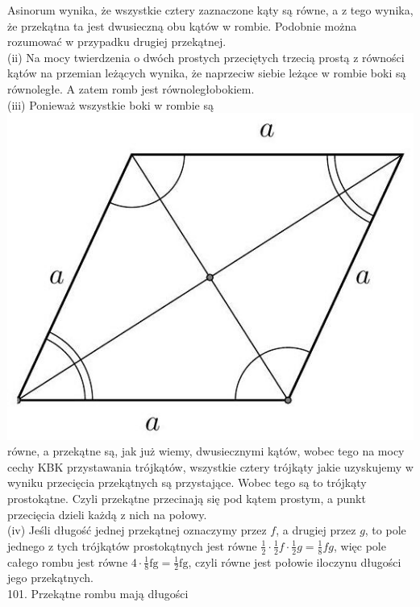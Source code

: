 \documentclass[10pt]{article}
\begin{document}
Asinorum wynika, że wszystkie cztery zaznaczone kąty są równe, a z tego wynika, że przekątna ta jest dwusieczną obu kątów w rombie. Podobnie można rozumować w przypadku drugiej przekątnej.\\
(ii) Na mocy twierdzenia o dwóch prostych przeciętych trzecią prostą z równości kątów na przemian leżących wynika, że naprzeciw siebie leżące w rombie boki są równoległe. A zatem romb jest równoległobokiem.\\
(iii) Ponieważ wszystkie boki w rombie są\\
\includegraphics[max width=\textwidth, center]{2024_11_21_71f62bd117d375398909g-139(2)}\\
równe, a przekątne są, jak już wiemy, dwusiecznymi kątów, wobec tego na mocy cechy KBK przystawania trójkątów, wszystkie cztery trójkąty jakie uzyskujemy w wyniku przecięcia przekątnych są przystające. Wobec tego są to trójkąty prostokątne. Czyli przekątne przecinają się pod kątem prostym, a punkt przecięcia dzieli każdą z nich na połowy.\\
(iv) Jeśli długość jednej przekątnej oznaczymy przez \(f\), a drugiej przez \(g\), to pole jednego z tych trójkątów prostokątnych jest równe \(\frac{1}{2} \cdot \frac{1}{2} f \cdot \frac{1}{2} g=\frac{1}{8} f g\), więc pole całego rombu jest równe \(4 \cdot \frac{1}{8} \mathrm{fg}=\frac{1}{2} \mathrm{fg}\), czyli równe jest połowie iloczynu długości jego przekątnych.\\
101. Przekątne rombu mają długości\\
\end{document}

